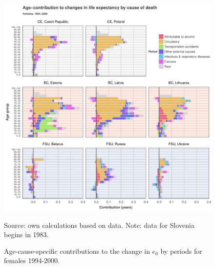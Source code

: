 \documentclass{article}
\begin{document}
\begin{figure}[h!]
\caption{Age-cause-specific contributions to the change in $e_0$ by periods for females 1994-2000.}
\centering
\begin{center}
\includegraphics[scale=.5]{Figures/Cause_e0_decomp_Females_1.pdf}
\end{center}
Source: own calculations based on \citet{HMD} data. Note: data for Slovenia begins in 1983.
\end{figure}

\newpage
\end{document}
